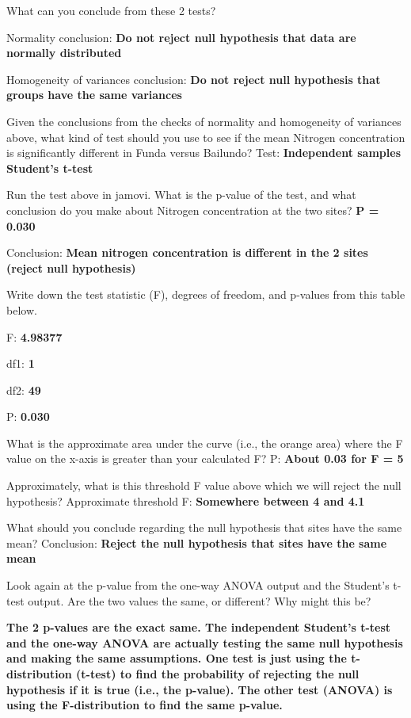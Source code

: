 \documentclass[
  openany]{scrbook}
\begin{document}
What can you conclude from these 2 tests?

Normality conclusion: \textbf{Do not reject null hypothesis that data are normally distributed}

Homogeneity of variances conclusion: \textbf{Do not reject null hypothesis that groups have the same variances}

Given the conclusions from the checks of normality and homogeneity of variances above, what kind of test should you use to see if the mean Nitrogen concentration is significantly different in Funda versus Bailundo? Test: \textbf{Independent samples Student's t-test}

Run the test above in jamovi. What is the p-value of the test, and what conclusion do you make about Nitrogen concentration at the two sites? \textbf{P = 0.030}

Conclusion: \textbf{Mean nitrogen concentration is different in the 2 sites (reject null hypothesis)}

Write down the test statistic (F), degrees of freedom, and p-values from this table below.

F: \textbf{4.98377}

df1: \textbf{1}

df2: \textbf{49}

P: \textbf{0.030}

What is the approximate area under the curve (i.e., the orange area) where the F value on the x-axis is greater than your calculated F? P: \textbf{About 0.03 for F = 5}

Approximately, what is this threshold F value above which we will reject the null hypothesis?
Approximate threshold F: \textbf{Somewhere between 4 and 4.1}

What should you conclude regarding the null hypothesis that sites have the same mean?
Conclusion: \textbf{Reject the null hypothesis that sites have the same mean}

Look again at the p-value from the one-way ANOVA output and the Student's t-test output. Are the two values the same, or different? Why might this be?

\textbf{The 2 p-values are the exact same. The independent Student's t-test and the one-way ANOVA are actually testing the same null hypothesis and making the same assumptions. One test is just using the t-distribution (t-test) to find the probability of rejecting the null hypothesis if it is true (i.e., the p-value). The other test (ANOVA) is using the F-distribution to find the same p-value.}
\end{document}
